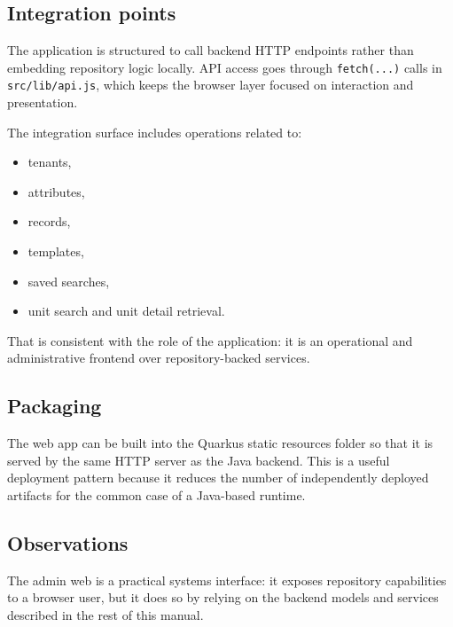 \subsection{Integration points}

The application is structured to call backend HTTP endpoints rather than embedding repository logic locally. API access goes through \texttt{fetch(...)} calls in \texttt{src/lib/api.js}, which keeps the browser layer focused on interaction and presentation.

The integration surface includes operations related to:
\begin{itemize}
\item tenants,
\item attributes,
\item records,
\item templates,
\item saved searches,
\item unit search and unit detail retrieval.
\end{itemize}

That is consistent with the role of the application: it is an operational and administrative frontend over repository-backed services.

\subsection{Packaging}

The web app can be built into the Quarkus static resources folder so that it is served by the same HTTP server as the Java backend. This is a useful deployment pattern because it reduces the number of independently deployed artifacts for the common case of a Java-based runtime.

\subsection{Observations}

The admin web is a practical systems interface: it exposes repository capabilities to a browser user, but it does so by relying on the backend models and services described in the rest of this manual.
